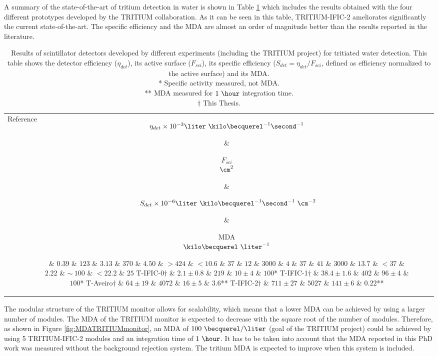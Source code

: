 \begin{enumerate}
A summary of the state-of-the-art of tritium detection in water is shown in Table \ref{tab:ComparisonResultsTritium} which includes the results obtained with the four different prototypes developed by the TRITIUM collaboration. As it can be seen in this table, TRITIUM-IFIC-2 ameliorates significantly the current state-of-the-art. The specific efficiency and the MDA are almost an order of magnitude better than the results reported in the literature.

\begin{table}[htbp]
\centering{}%
\begin{tabular}{lcrcc}
\toprule 
Reference & \parbox{5em}{$\eta_{det}\times10^{-3}\\\liter~\kilo\becquerel^{-1}\second^{-1}$}  & \parbox{3.5em}{\raggedleft $F_{sci}$\\ $\cm^2$}  & \parbox{6.5em}{$~S_{det}\times 10^{-6}\\\liter~\kilo\becquerel^{-1}\second^{-1}~\cm^{-2}$} &  \parbox{3.5em}{MDA\\$\kilo\becquerel~\liter^{-1}$} \tabularnewline
\midrule
\midrule 
\cite{Muramatsu} & $0.39$ & $123$ & $3.13$ & $370$ \tabularnewline
\cite{Moghissi} & $4.50$ & $>424$ & $<10.6$ & $37$ \tabularnewline
\cite{Osborne} & $12$ & $3000$ & $4$ & $37$ \tabularnewline
\cite{Ratnakaran} & $41$ & $3000$ & $13.7$ & $<37$ \tabularnewline
\cite{Hofstetter1} & $2.22$ & $\sim~100$ & $<22.2$ & $25$ \tabularnewline
T-IFIC-0$\dagger$ & $2.1 \pm 0.8$ & $219$ & $10 \pm 4$ & $100$* \tabularnewline
T-IFIC-1$\dagger$ & $38.4 \pm 1.6$ & $402$ & $96 \pm 4$ & $100$* \tabularnewline
T-Aveiro$\dagger$ & $64 \pm 19$ & $4072$ & $16 \pm 5$ & $3.6$** \tabularnewline
T-IFIC-2$\dagger$ & $711 \pm 27$ & $5027$ & $141 \pm 6$ & $0.22$** \tabularnewline
\bottomrule
\end{tabular}
\caption{Results of scintillator detectors developed by different experiments (including the TRITIUM project) for tritiated water detection. This table shows the detector efficiency ($\eta_{det}$), its active surface ($F_{sci}$), its specific efficiency ($S_{det}=\eta_{det}/F_{sci}$, defined as efficiency normalized to the active surface) and its MDA.\\
* Specific activity measured, not MDA.\\ 
** MDA measured for $1~\hour$ integration time.\\
$\dagger$ This Thesis.}
\label{tab:ComparisonResultsTritium}
\end{table}

The modular structure of the TRITIUM monitor allows for scalability, which means that a lower MDA can be achieved by using a larger number of modules. The MDA of the TRITIUM monitor is expected to decrease with the square root of the number of modules. Therefore, as shown in Figure \ref{fig:MDATRITIUMmonitor}, an MDA of  $100~\becquerel/\liter$ (goal of the TRITIUM project) could be achieved by using 5 TRITIUM-IFIC-2 modules and an integration time of $1~\hour$. It has to be taken into account that the MDA reported in this PhD work was measured without the background rejection system. The tritium MDA is expected to improve when this system is included.


\end{enumerate}
